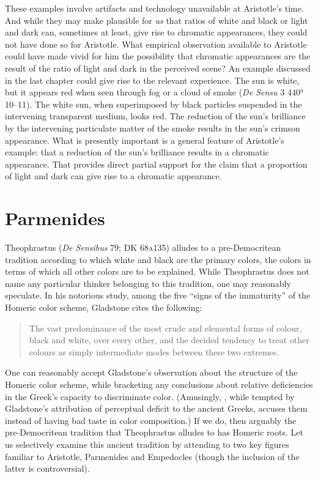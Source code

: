 These examples involve artifacts and technology unavailable at Aristotle's time. And while they may make plausible for \emph{us} that ratios of white and black or light and dark can, sometimes at least, give rise to chromatic appearances, they could not have done so for Aristotle. What empirical observation available to Aristotle could have made vivid for him the possibility that chromatic appearances are the result of the ratio of light and dark in the perceived scene? An example discussed in the last chapter could give rise to the relevant experience. The sun is white, but it appears red when seen through fog or a cloud of smoke (\emph{De Sensu} 3 440\( ^{a} \)10--11).  The white sun, when superimposed by black particles suspended in the intervening transparent medium, looks red. The reduction of the sun's brilliance by the intervening particulate matter of the smoke results in the sun's crimson appearance. What is presently important is a general feature of Aristotle's example: that a reduction of the sun's brilliance results in a chromatic appearance. That provides direct partial support for the claim that a proportion of light and dark can give rise to a chromatic appearance. %


\section{Parmenides} %
\label{sec:parmenides}
Theophrastus (\emph{De Sensibus} 79; DK 68\textsc{a}135) alludes to a pre-Democritean tradition according to which white and black are the primary colors, the colors in terms of which all other colors are to be explained. While Theophrastus does not name any particular thinker belonging to this tradition, one may reasonably speculate. In his notorious study, among the five ``signs of the immaturity'' of the Homeric color scheme, Gladstone cites the following:  
\begin{quote}
    The vast predominance of the most crude and elemental forms of colour, black and white, over every other, and the decided tendency to treat other colours as simply intermediate modes between these two extremes. \citep[458]{Gladstone:1858fk}
\end{quote}
One can reasonably accept Gladstone's observation about the structure of the Ho\-meric color scheme, while bracketing any conclusions about relative deficiencies in the Greek's capacity to discriminate color. (Amusingly, \citealt[162]{Platnauer:1921bh}, while tempted by Gladstone's attribution of perceptual deficit to the ancient Greeks, accuses them instead of having bad taste in color composition.) If we do, then arguably the pre-De\-mo\-cri\-tean tradition that Theophrastus alludes to has Homeric roots. Let us selectively examine this ancient tradition by attending to two key figures familiar to Aristotle, Parmenides and Empedocles (though the inclusion of the latter is controversial).

